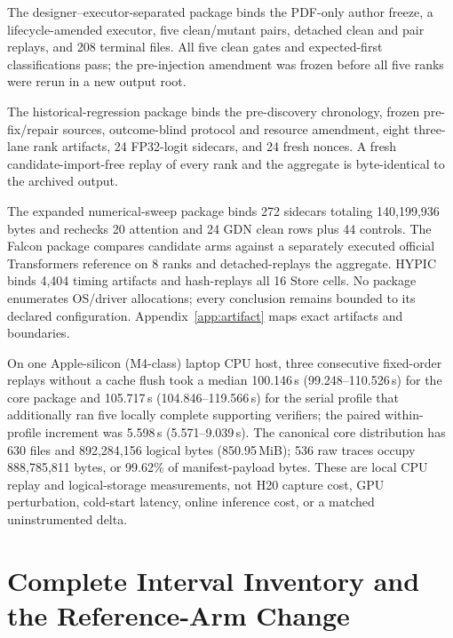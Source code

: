 \documentclass{article}
\begin{document}
The designer--executor-separated package binds the PDF-only author freeze, a
lifecycle-amended executor, five clean/mutant pairs, detached clean and pair
replays, and 208 terminal files.  All five clean gates and expected-first
classifications pass; the pre-injection amendment was frozen before all five
ranks were rerun in a new output root.

The historical-regression package binds the pre-discovery chronology, frozen
pre-fix/repair sources, outcome-blind protocol and resource amendment, eight
three-lane rank artifacts, 24 FP32-logit sidecars, and 24 fresh nonces.  A fresh
candidate-import-free replay of every rank and the aggregate is byte-identical
to the archived output.

The expanded numerical-sweep package binds 272 sidecars totaling 140,199,936
bytes and rechecks 20 attention and 24 GDN clean rows plus 44 controls.  The
Falcon package compares candidate arms against a separately executed official
Transformers reference on 8 ranks and detached-replays the aggregate.  HYPIC
binds 4,404 timing artifacts and hash-replays all 16 Store cells.  No package
enumerates OS/driver allocations; every conclusion remains bounded to its
declared configuration.  Appendix~\ref{app:artifact} maps exact artifacts and
boundaries.

On one Apple-silicon (M4-class) laptop CPU host, three consecutive fixed-order
replays without a
cache flush took a median 100.146\,s (99.248--110.526\,s) for the core package
and 105.717\,s (104.846--119.566\,s) for the serial profile that additionally
ran five locally complete supporting verifiers; the paired within-profile
increment was 5.598\,s (5.571--9.039\,s).  The canonical core distribution has
630 files and 892,284,156 logical bytes (850.95\,MiB); 536 raw traces occupy
888,785,811 bytes, or 99.62\% of manifest-payload bytes.  These are local CPU
replay and logical-storage measurements, not H20 capture cost, GPU perturbation,
cold-start latency, online inference cost, or a matched uninstrumented delta.

\section{Complete Interval Inventory and the Reference-Arm Change}
\label{app:all-intervals}
\end{document}
